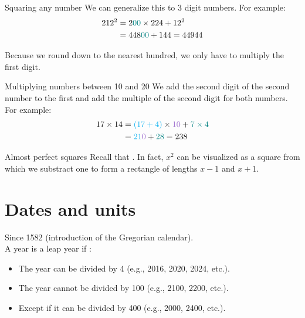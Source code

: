 \documentclass[10pt, french]{article}
\begin{document}
\begin{multicols*}{3}
\begin{CHPT_SUMM}{Squaring any number}
We can generalize this to 3 digit numbers.
For example:
	\begin{align*}
	212^{2}	
	&=	2\textcolor{teal}{00} \times 224 + 12^{2}	\\
	&=	448\textcolor{teal}{00} + 144
	=	44944
	\end{align*}
	
Because we round down to the nearest hundred, we only have to multiply the first digit.
\end{CHPT_SUMM}

\begin{CHPT_SUMM}{Multiplying numbers between 10 and 20}
We add the second digit of the second number to the first and add the multiple of the second digit for both numbers.
For example:
	\begin{align*}
	17 \times 14
	&=	\textcolor{cyan}{(17 + 4)} \times \textcolor{amethyst}{10} + \textcolor{teal}{7 \times 4}	\\
	&=	\textcolor{cyan}{21}\textcolor{amethyst}{0} + \textcolor{teal}{28}	
	=	238
	\end{align*}
\end{CHPT_SUMM}


\begin{CHPT_SUMM}{Almost perfect squares}
Recall that . In fact, $x^{2}$ can be visualized as a square from which we substract one to form a rectangle of lengths $x	-	1$ and $x	+	1$.
\end{CHPT_SUMM}

\pagebreak
\section{Dates and units}
Since 1582 (introduction of the Gregorian calendar).\\

A year is a leap year if :
\begin{itemize}
	\item	The year can be divided by 4 (e.g., 2016, 2020, 2024, etc.).
	\item	The year cannot be divided by 100 (e.g., 2100, 2200, etc.).
	\item	Except if it can be divided by 400 (e.g., 2000, 2400, etc.).	
\end{itemize}


\end{multicols*}
\end{document}
